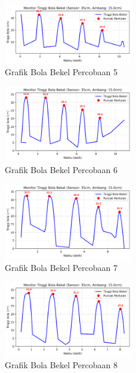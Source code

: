 \begin{figure}[htbp]
    \centering
    \includegraphics[width=0.5\textwidth]{chapters/DataPercobaan/Grafik_Bola_Bekel_5.png}
    \caption{Grafik Bola Bekel Percobaan 5}
\end{figure}
\begin{figure}[htbp]
    \centering
    \includegraphics[width=0.5\textwidth]{chapters/DataPercobaan/Grafik_Bola_Bekel_6.png}
    \caption{Grafik Bola Bekel Percobaan 6}
\end{figure}
\begin{figure}[htbp]
    \centering
    \includegraphics[width=0.5\textwidth]{chapters/DataPercobaan/Grafik_Bola_Bekel_7.png}
    \caption{Grafik Bola Bekel Percobaan 7}
\end{figure}
\begin{figure}[htbp]
    \centering
    \includegraphics[width=0.5\textwidth]{chapters/DataPercobaan/Grafik_Bola_Bekel_8.png}
    \caption{Grafik Bola Bekel Percobaan 8}
\end{figure}
